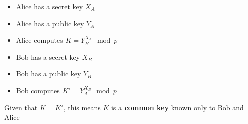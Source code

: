 \documentclass{easyclass}
\begin{document}
\begin{lem}{}
    \begin{minipage}[t]{0.45\linewidth}
        \centering
        \begin{itemize}
            \item Alice has a secret key  $X_A$
            \item Alice has a public key $Y_A$
            \item Alice computes $K = Y_B^{X_A} \mod p$
        \end{itemize}
        \end{minipage}
        \hspace{0.5cm}
        \begin{minipage}[t]{0.45\linewidth}
            \begin{itemize}
                \item Bob has a secret key $X_B$
                \item Bob has a public key  $Y_B$
                \item Bob computes $K' = Y_A^{X_B} \mod p$
            \end{itemize}
        \centering
    \end{minipage}

    \begin{definition}{}
        Given that $K = K'$, this means $K$ is a \textbf{common key} known only to Bob and Alice 
    \end{definition}
\end{lem}
\newpage
\end{document}
